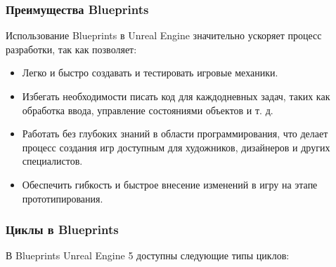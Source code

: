 \subsubsection{Преимущества Blueprints}
Использование Blueprints в Unreal Engine значительно ускоряет процесс разработки, так как позволяет:
\begin{itemize}
    \item Легко и быстро создавать и тестировать игровые механики.
    \item Избегать необходимости писать код для каждодневных задач, таких как обработка ввода, управление состояниями объектов и т. д.
    \item Работать без глубоких знаний в области программирования, что делает процесс создания игр доступным для художников, дизайнеров и других специалистов.
    \item Обеспечить гибкость и быстрое внесение изменений в игру на этапе прототипирования.
\end{itemize}

\subsubsection{Циклы в Blueprints}
В Blueprints Unreal Engine 5 доступны следующие типы циклов:

